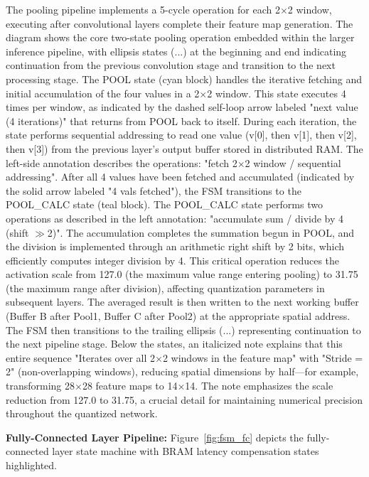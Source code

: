 \documentclass[12pt,a4paper]{report}
\begin{document}
The pooling pipeline implements a 5-cycle operation for each 2$\times$2 window, executing after convolutional layers complete their feature map generation. The diagram shows the core two-state pooling operation embedded within the larger inference pipeline, with ellipsis states (...) at the beginning and end indicating continuation from the previous convolution stage and transition to the next processing stage. The POOL state (cyan block) handles the iterative fetching and initial accumulation of the four values in a 2$\times$2 window. This state executes 4 times per window, as indicated by the dashed self-loop arrow labeled "next value (4 iterations)" that returns from POOL back to itself. During each iteration, the state performs sequential addressing to read one value (v[0], then v[1], then v[2], then v[3]) from the previous layer's output buffer stored in distributed RAM. The left-side annotation describes the operations: "fetch 2$\times$2 window / sequential addressing". After all 4 values have been fetched and accumulated (indicated by the solid arrow labeled "4 vals fetched"), the FSM transitions to the POOL\_CALC state (teal block). The POOL\_CALC state performs two operations as described in the left annotation: "accumulate sum / divide by 4 (shift $\gg$2)". The accumulation completes the summation begun in POOL, and the division is implemented through an arithmetic right shift by 2 bits, which efficiently computes integer division by 4. This critical operation reduces the activation scale from 127.0 (the maximum value range entering pooling) to 31.75 (the maximum range after division), affecting quantization parameters in subsequent layers. The averaged result is then written to the next working buffer (Buffer B after Pool1, Buffer C after Pool2) at the appropriate spatial address. The FSM then transitions to the trailing ellipsis (...) representing continuation to the next pipeline stage. Below the states, an italicized note explains that this entire sequence "Iterates over all 2$\times$2 windows in the feature map" with "Stride = 2" (non-overlapping windows), reducing spatial dimensions by half—for example, transforming 28$\times$28 feature maps to 14$\times$14. The note emphasizes the scale reduction from 127.0 to 31.75, a crucial detail for maintaining numerical precision throughout the quantized network.

\textbf{Fully-Connected Layer Pipeline:} Figure~\ref{fig:fsm_fc} depicts the fully-connected layer state machine with BRAM latency compensation states highlighted.
\end{document}
